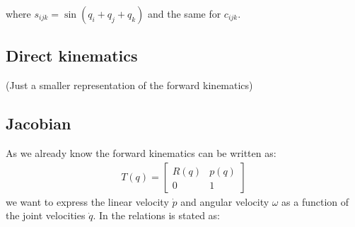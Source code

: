 where $s_{ijk} = \sin{(q_i + q_j + q_k)}$ and the same for $c_{ijk}$. 

\subsection{Direct kinematics}
(Just a smaller representation of the forward kinematics)

\subsection{Jacobian}
As we already know the forward kinematics can be written as:
\begin{align*}
    T(q) = 
    \begin{bmatrix}
        R(q) & p(q)\\
        0 & 1
    \end{bmatrix}
\end{align*}
we want to express the linear velocity $\dot{p}$ and angular velocity $\omega$ as a function of the joint velocities $\dot{q}$. In \cite{Siciliano} the relations is stated as:

